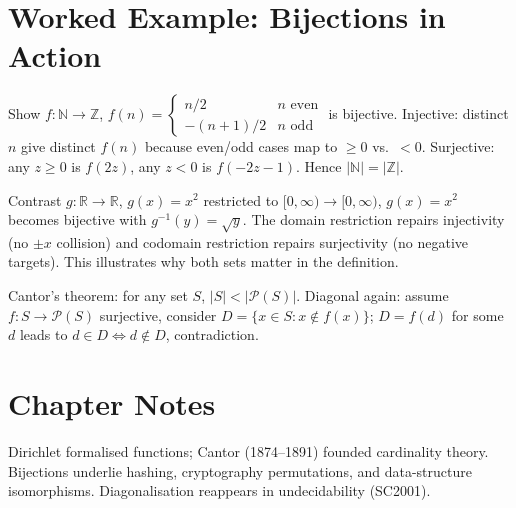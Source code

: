 \section{Worked Example: Bijections in Action}
Show $f:\mathbb{N}\to\mathbb{Z}$, $f(n)=\begin{cases}n/2 & n\text{ even}\\-(n+1)/2 & n\text{ odd}\end{cases}$ is bijective. Injective: distinct $n$ give distinct $f(n)$ because even/odd cases map to $\ge0$ vs.\ $<0$. Surjective: any $z\ge0$ is $f(2z)$, any $z<0$ is $f(-2z-1)$. Hence $|\mathbb{N}|=|\mathbb{Z}|$.

Contrast $g:\mathbb{R}\to\mathbb{R}$, $g(x)=x^2$ restricted to $[0,\infty)\to[0,\infty)$, $g(x)=x^2$ becomes bijective with $g^{-1}(y)=\sqrt y$. The domain restriction repairs injectivity (no $\pm x$ collision) and codomain restriction repairs surjectivity (no negative targets). This illustrates why both sets matter in the definition.

Cantor's theorem: for any set $S$, $|S|<|\mathcal{P}(S)|$. Diagonal again: assume $f:S\to\mathcal{P}(S)$ surjective, consider $D=\{x\in S:x\notin f(x)\}$; $D=f(d)$ for some $d$ leads to $d\in D\iff d\notin D$, contradiction.

\section{Chapter Notes}
Dirichlet formalised functions; Cantor (1874--1891) founded cardinality theory. Bijections underlie hashing, cryptography permutations, and data-structure isomorphisms. Diagonalisation reappears in undecidability (SC2001).


